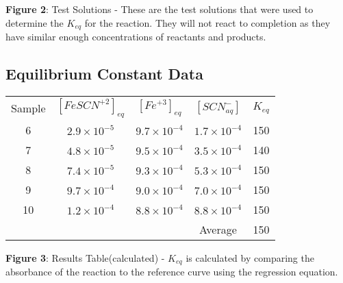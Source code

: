 \documentclass{article}
\begin{document}
\centering
\textbf{Figure 2}: Test Solutions - These are the test solutions that were used to determine the $K_{eq}$ for the reaction. They will not react to completion as they have similar enough concentrations of reactants and products.
$\ $
\newpage 
\subsection{Equilibrium Constant Data}
\begin{table}[h!]
    \centering
        \begin{tabular}{c|c|c|c|c}
            Sample & $[FeSCN^{+2}]_{eq}$ & $[Fe^{+3}]_{eq}$ & $[SCN^-_{aq}]$ & $K_{eq}$ \\
            6 & $2.9\times 10^{-5}$ & $9.7\times 10^{-4}$ & $1.7\times10^{-4}$ & 150 \\
            7 & $4.8\times 10^{-5}$ & $9.5\times 10^{-4}$ & $3.5\times10^{-4}$ & 140 \\
            8 & $7.4\times 10^{-5}$ & $9.3\times 10^{-4}$ & $5.3\times10^{-4}$ & 150 \\
            9 & $9.7\times 10^{-4}$ & $9.0\times 10^{-4}$ & $7.0\times10^{-4}$ & 150 \\
            10 & $1.2\times 10^{-4}$ & $8.8\times 10^{-4}$ & $8.8\times 10^{-4}$ & 150\\
            & & &Average&150
        \end{tabular}
    \end{table}

\centering

\textbf{Figure 3}: Results Table(calculated) - $K_{eq}$ is calculated by comparing the absorbance of the reaction to the reference curve using the regression equation.
$\ $

$\ $ 
\end{document}
